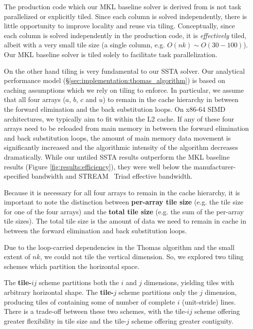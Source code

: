 \documentclass{sig-alternate-05-2015}
\begin{document}
The production code which our MKL baseline solver is derived from is not task
  parallelized or explicitly tiled.
Since each column is solved independently, there is little opportunity to improve
  locality and reuse via tiling.
Conceptually, since each column is solved independently in the production code,
  it is \emph{effectively} tiled, albeit with a very small tile size (a single
  column, e.g. \(O(nk) \sim O(30-100)\)).
Our MKL baseline solver is tiled solely to facilitate task parallelization.

On the other hand tiling is very fundamental to our SSTA solver.
Our analytical performance model (\S\ref{sec:implementation:thomas_algorithm})
  is based on caching assumptions which we rely on tiling to enforce.
In particular, we assume that all four arrays (\(a\), \(b\), \(c\) and \(u\))
  to remain in the cache hierarchy in between the forward elimination and the
  back substitution loops.
On x86-64 SIMD architectures, we typically aim to fit within the L2 cache.
If any of these four arrays need to be reloaded from main memory in between the
  forward elimination and back substitution loops, the amount of main memory data
  movement is significantly increased and the algorithmic intensity of the
  algorithm decreases dramatically.
While our untiled SSTA results outperform the MKL baseline results (Figure
  \ref{fig:results:efficiency}), they were well below the manufacturer-specified
  bandwidth and STREAM~\cite{stream} Triad effective bandwidth.

Because it is necessary for all four arrays to remain in the cache hierarchy, 
  it is important to note the distinction between \textbf{per-array tile size}
  (e.g. the tile size for one of the four arrays) and the
  \textbf{total tile size} (e.g. the sum of the per-array tile sizes).
The total tile size is the amount of data we need to remain in cache in between
  the forward elimination and back substitution loops.


Due to the loop-carried dependencies in the Thomas algorithm and the small
  extent of \(nk\), we could not tile the vertical dimension. So, we explored two
  tiling schemes which partition the horizontal space.

The \textbf{tile-\(ij\)} scheme partitions both the \(i\) and \(j\) dimensions,
  yielding tiles with arbitrary horizontal shape. 
The \textbf{tile-\(j\)} scheme partitions only the \(j\) dimension, producing
  tiles of containing some of number of complete \(i\) (unit-stride) lines.
There is a trade-off between these two schemes, with the tile-\(ij\) scheme
  offering greater flexibility in tile size and the tile-\(j\) scheme offering
  greater contiguity. 
\end{document}
